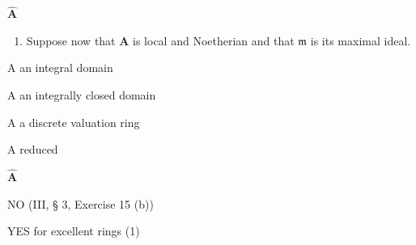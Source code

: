 \textbf{\(\hat{\mathbf{A}}\)}\par

\begin{enumerate}
\def\labelenumi{(\alph{enumi})}
\setcounter{enumi}{1}
\tightlist
\item
  Suppose now that \(\mathbf{A}\) is local and Noetherian and that \(\mathfrak{m}\) is its maximal ideal.
\end{enumerate}

A an integral domain

A an integrally closed domain

A a discrete valuation ring

A reduced

\textbf{\(\hat{\mathbf{A}}\)}\par

NO (III, § 3, Exercise 15 (b))

YES for excellent rings (1)


